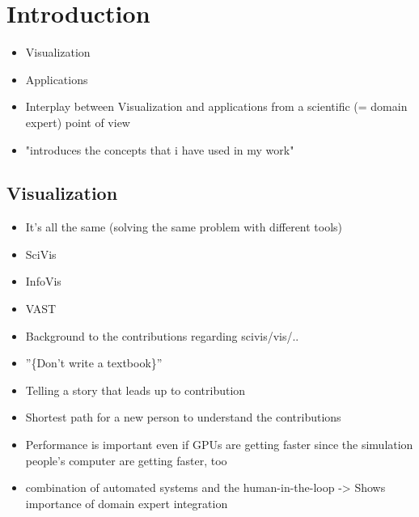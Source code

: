 \chapter{Introduction}
\label{ch:introduction}

\begin{itemize}
\item Visualization
\item Applications
\item Interplay between Visualization and applications from a scientific (= domain expert) point of view
\item "introduces the concepts that i have used in my work"

\end{itemize}

\section{Visualization}
\begin{itemize}
\item It's all the same (solving the same problem with different tools)
\item SciVis
\item InfoVis
\item VAST
\item Background to the contributions regarding scivis/vis/..
\item ''\{Don't write a textbook\}''
\item Telling a story that leads up to contribution 
\item Shortest path for a new person to understand the contributions
\item Performance is important even if GPUs are getting faster since the simulation people's computer are getting faster, too
\item combination of automated systems and the human-in-the-loop \cite{munzner2014visualization} \cite{van2005value} -> Shows importance of domain expert integration
\end{itemize}

